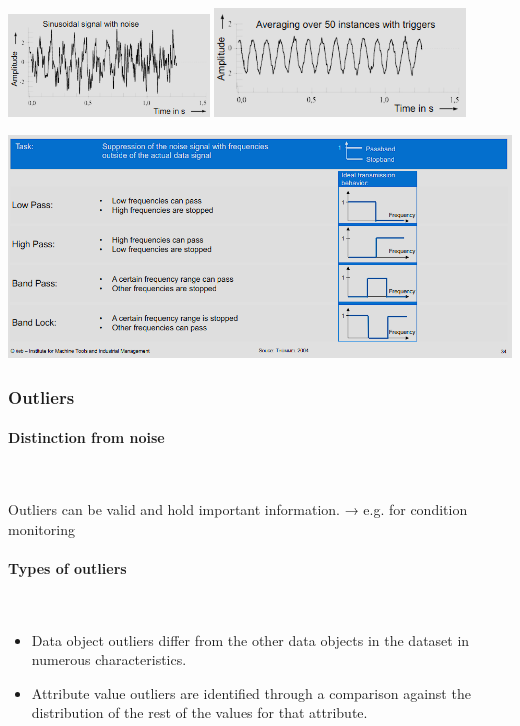 \documentclass[12pt, a4paper, oneside, justified]{article}
\begin{document}
\begin{center}
\includegraphics[width=0.4\textwidth]{../img/3-16.png}
\includegraphics[width=0.5\textwidth]{../img/3-17.png}
\end{center}

\begin{center}
\includegraphics[width=1\textwidth]{../img/3-18.png}
\end{center}

\subsubsection{Outliers}

\paragraph*{Distinction from noise}~{}

Outliers can be valid and hold important information. 
→ e.g. for condition monitoring

\paragraph*{Types of outliers}~{}
\begin{itemize}
    \item Data object outliers differ from the other data objects in the dataset in numerous characteristics.
    \item Attribute value outliers are identified through a comparison against the distribution of the rest of the values for that attribute.    
\end{itemize}
\end{document}
